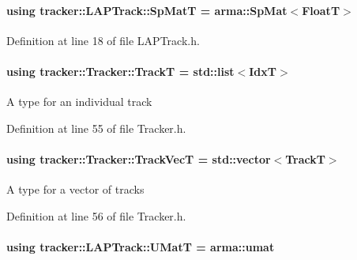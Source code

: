 \paragraph[{\texorpdfstring{Sp\+MatT}{SpMatT}}]{\setlength{\rightskip}{0pt plus 5cm}using {\bf tracker\+::\+L\+A\+P\+Track\+::\+Sp\+MatT} =  arma\+::\+Sp\+Mat$<${\bf FloatT}$>$}\hypertarget{classtracker_1_1LAPTrack_a85e4da204f0881dd4b46caf38bcef737}{}\label{classtracker_1_1LAPTrack_a85e4da204f0881dd4b46caf38bcef737}


Definition at line 18 of file L\+A\+P\+Track.\+h.

\paragraph[{\texorpdfstring{TrackT}{TrackT}}]{\setlength{\rightskip}{0pt plus 5cm}using {\bf tracker\+::\+Tracker\+::\+TrackT} =  std\+::list$<${\bf IdxT}$>$\hspace{0.3cm}{\ttfamily [inherited]}}\hypertarget{classtracker_1_1Tracker_ac1b06aee1b9d85fb75cf6a9579eb0e84}{}\label{classtracker_1_1Tracker_ac1b06aee1b9d85fb75cf6a9579eb0e84}
A type for an individual track 

Definition at line 55 of file Tracker.\+h.

\paragraph[{\texorpdfstring{Track\+VecT}{TrackVecT}}]{\setlength{\rightskip}{0pt plus 5cm}using {\bf tracker\+::\+Tracker\+::\+Track\+VecT} =  std\+::vector$<${\bf TrackT}$>$\hspace{0.3cm}{\ttfamily [inherited]}}\hypertarget{classtracker_1_1Tracker_a25ee8479eb10f1619a8eefd5d310eeb7}{}\label{classtracker_1_1Tracker_a25ee8479eb10f1619a8eefd5d310eeb7}
A type for a vector of tracks 

Definition at line 56 of file Tracker.\+h.

\paragraph[{\texorpdfstring{U\+MatT}{UMatT}}]{\setlength{\rightskip}{0pt plus 5cm}using {\bf tracker\+::\+L\+A\+P\+Track\+::\+U\+MatT} =  arma\+::umat}\hypertarget{classtracker_1_1LAPTrack_a24e342e3b28213ea690b9bb806fc380e}{}\label{classtracker_1_1LAPTrack_a24e342e3b28213ea690b9bb806fc380e}


